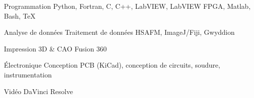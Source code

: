 
\begin{cvskills}

    \cvskill
{Programmation}
    {Python, Fortran, C, C++, LabVIEW, LabVIEW FPGA, Matlab, Bash, \TeX}

    \cvskill
{Analyse de donn\'ees}
    {Traitement de donn\'ees HSAFM, ImageJ/Fiji, Gwyddion}

    \cvskill
    {Impression 3D \& CAO}
    {Fusion 360}

    \cvskill
    {\'Electronique}
    {Conception PCB (KiCad), conception de circuits, soudure, instrumentation}

    \cvskill
    {Vid\'eo}
    {DaVinci Resolve}

\end{cvskills}
